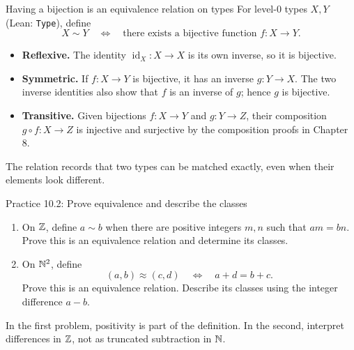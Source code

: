 \begin{frame}{Having a bijection is an equivalence relation on types}
For level-0 types $X,Y$ (Lean: \texttt{Type}), define
\[
 X\sim Y\quad\Longleftrightarrow\quad
 \text{there exists a bijective function }f:X\to Y.
\]
\begin{itemize}
\item \textbf{Reflexive.} The identity $\operatorname{id}_X:X\to X$ is its own inverse,
so it is bijective.
\item \textbf{Symmetric.} If $f:X\to Y$ is bijective, it has an inverse $g:Y\to X$.
The two inverse identities also show that $f$ is an inverse of $g$; hence $g$ is bijective.
\item \textbf{Transitive.} Given bijections $f:X\to Y$ and $g:Y\to Z$,
their composition $g\circ f:X\to Z$ is injective and surjective by the composition proofs in Chapter 8.
\end{itemize}
The relation records that two types can be matched exactly, even when their elements look different.
\end{frame}

\begin{frame}{Practice 10.2: Prove equivalence and describe the classes}
\begin{enumerate}
\item On $\mathbb{Z}$, define $a\sim b$ when there are positive integers $m,n$ such that
$am=bn$. Prove this is an equivalence relation and determine its classes.
\item On $\mathbb{N}^2$, define
\[
 (a,b)\approx(c,d)\quad\Longleftrightarrow\quad a+d=b+c.
\]
Prove this is an equivalence relation. Describe its classes using the integer difference $a-b$.
\end{enumerate}
In the first problem, positivity is part of the definition.
In the second, interpret differences in $\mathbb{Z}$, not as truncated subtraction in $\mathbb{N}$.
\end{frame}

